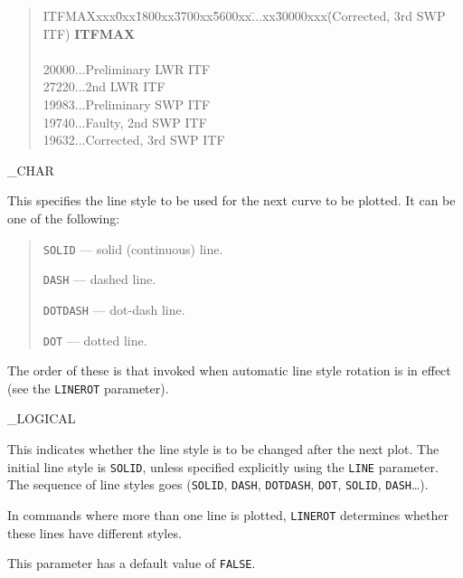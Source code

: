 {{   \begin {quote}
   \begin {tabbing}
   ITFMAXxxx\= 0xx\= 1800xx\= 3700xx\= 5600xx\= ...xx\= 30000xxx\= (Corrected, 3rd SWP ITF)\kill
   {\bf ITFMAX}\>\>\>\>\>\\
   \\
   20000\>...\>Preliminary LWR ITF\\
   27220\>...\>2nd LWR ITF\\
   19983\>...\>\>Preliminary SWP ITF\\
   19740\>...\>Faulty, 2nd SWP ITF\\
   19632\>...\>Corrected, 3rd SWP ITF\\
   \end {tabbing}
   \end {quote}
}

{
   \_CHAR
}{
   This specifies the line style to be used for the next curve to be
   plotted.
   It can be one of the following:

   \begin {quote}
   \begin {description}
      \item {\tt SOLID} --- solid (continuous) line.
      \item {\tt DASH} --- dashed line.
      \item {\tt DOTDASH} --- dot-dash line.
      \item {\tt DOT} --- dotted line.
   \end {description}
   \end {quote}

   The order of these is that invoked when automatic line style rotation
   is in effect (see the \verb+LINEROT+ parameter).
}

{
   \_LOGICAL
}{
   This indicates whether the line style is to be changed after the
   next plot.
   The initial line style is \verb+SOLID+, unless specified explicitly
   using the \verb+LINE+ parameter.
   The sequence of line styles goes (\verb+SOLID+, \verb+DASH+, \verb+DOTDASH+,
   \verb+DOT+, \verb+SOLID+, \verb+DASH+\dots).

   In commands where more than one line is plotted, \verb+LINEROT+ determines
   whether these lines have different styles.

   This parameter has a default value of \verb+FALSE+\@.
}

}
